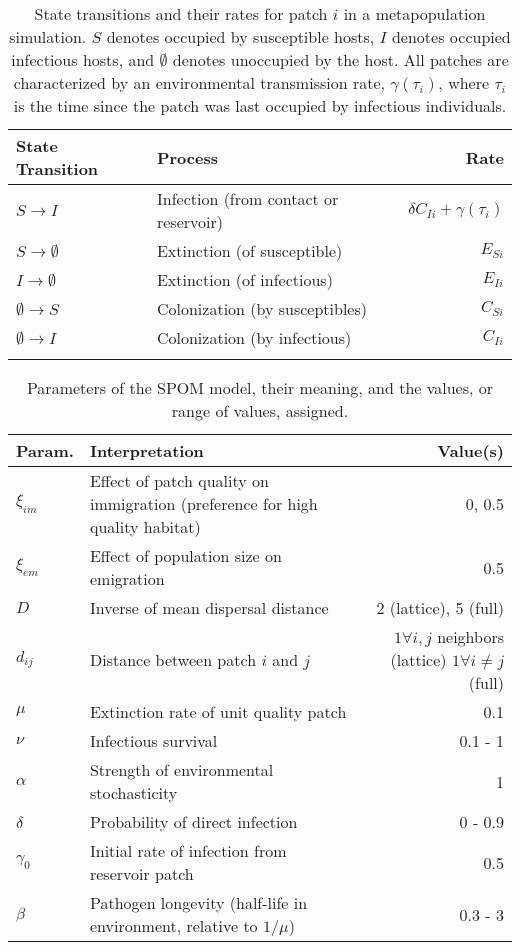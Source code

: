 \documentclass{article}
\begin{document}
\begin{table}
\caption{State transitions and their rates for patch $i$ in a metapopulation simulation.  $S$ denotes occupied by  susceptible hosts, $I$ denotes occupied infectious hosts, and $\emptyset$ denotes unoccupied by the host.  All patches are characterized by an environmental transmission rate, $\gamma(\tau_i)$, where $\tau_i$ is the time since the patch was last occupied by infectious individuals.}
\begin{tabular}{llr}
State Transition & Process &  Rate \\
\hline
$S \rightarrow I$ & Infection (from contact or reservoir) & $\delta C_{Ii} + \gamma(\tau_i)$\\
$S \rightarrow \emptyset $ & Extinction (of susceptible) & $E_{Si}$\\
$I \rightarrow \emptyset $ & Extinction (of infectious) &  $E_{Ii}$ \\
$\emptyset \rightarrow S$ & Colonization (by susceptibles) & $C_{Si}$\\
$\emptyset \rightarrow I$ & Colonization (by infectious) & $C_{Ii}$\\
\label{transitions}
\end{tabular}
\end{table}

\begin{table}[h!]   
\caption{Parameters of the SPOM model, their meaning, and the values, or range of values, assigned.}
\begin{tabular}{p{1cm} p{6cm} r}
Param. & Interpretation &  Value(s) \\
\hline
$\xi_{im}$ & Effect of patch quality on immigration (preference for high quality habitat) & 0, 0.5 \\
$\xi_{em}$ & Effect of population size on emigration & 0.5  \\
$D$& Inverse of mean dispersal distance & 2 (lattice), 5 (full) \\
$d_{ij}$ & Distance between patch $i$ and $j$ & \parbox[t]{4cm}{\raggedleft $1 \forall i, j$ neighbors (lattice)\\ $1 \forall  i\neq j$ (full)}\\
\hline
$\mu$ & Extinction rate of unit quality patch & 0.1 \\
$\nu$ & Infectious survival & 0.1 - 1 \\
$\alpha$ & Strength of environmental stochasticity & 1 \\
\hline
$\delta$ & Probability of direct infection & 0 - 0.9 \\
$\gamma_0$ & Initial rate of infection from reservoir patch & 0.5\\
$\beta$ & Pathogen longevity (half-life in environment, relative to $1/\mu$) & 0.3 - 3
 \end{tabular}
\label{params}
\end{table}
\end{document}
